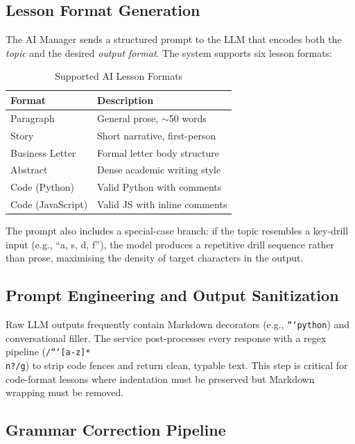 \documentclass[conference]{IEEEtran}
\begin{document}
\subsection{Lesson Format Generation}

The AI Manager sends a structured prompt to the LLM that encodes
both the \emph{topic} and the desired \emph{output format}. The
system supports six lesson formats:

\begin{table}[h]
\centering
\caption{Supported AI Lesson Formats}
\begin{tabular}{ll}
\toprule
\textbf{Format}       & \textbf{Description} \\
\midrule
Paragraph             & General prose, $\sim$50 words \\
Story                 & Short narrative, first-person \\
Business Letter       & Formal letter body structure \\
Abstract              & Dense academic writing style \\
Code (Python)         & Valid Python with comments \\
Code (JavaScript)     & Valid JS with inline comments \\
\bottomrule
\end{tabular}
\end{table}

The prompt also includes a special-case branch: if the topic resembles
a key-drill input (e.g., ``a, s, d, f''), the model produces a
repetitive drill sequence rather than prose, maximising the density of
target characters in the output.

\subsection{Prompt Engineering and Output Sanitization}

Raw LLM outputs frequently contain Markdown decorators (e.g.,
\texttt{```python}) and conversational filler. The service
post-processes every response with a regex pipeline
(\texttt{/```[a-z]*\\n?/g}) to strip code fences and return clean,
typable text. This step is critical for code-format lessons where
indentation must be preserved but Markdown wrapping must be removed.

\subsection{Grammar Correction Pipeline}
\end{document}
